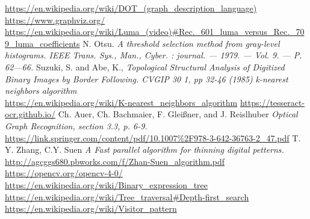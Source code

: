 \documentclass[makeidx, a4paper, 14pt]{extarticle}
\begin{document}
\begin{thebibliography}{}
     \url{https://en.wikipedia.org/wiki/DOT_(graph_description_language)}
        \url{https://www.graphviz.org/}
     \url{https://en.wikipedia.org/wiki/Luma_(video)#Rec._601_luma_versus_Rec._709_luma_coefficients}
     N. Otsu.
        \textit{A threshold selection method from gray-level histograms. IEEE Trans. Sys., Man., Cyber. : journal. — 1979. — Vol. 9. — P. 62—66.}
     Suzuki, S. and Abe, K.,
        \textit{Topological Structural Analysis of Digitized Binary Images by Border Following. CVGIP 30 1, pp 32-46 (1985)}
        \textit{k-nearest neighbors algorithm} \\
        \url{https://en.wikipedia.org/wiki/K-nearest_neighbors_algorithm}
        \url{https://tesseract-ocr.github.io/}
     Ch. Auer, Ch. Bachmaier, F. Gleißner, and J. Reislhuber
        \textit{Optical Graph Recognition, section 3.3, p. 6-9.}
        \url{https://link.springer.com/content/pdf/10.1007%2F978-3-642-36763-2_47.pdf}
      T. Y. Zhang, C.Y. Suen
        \textit{A Fast parallel algorithm for thinning digital petterns.}
        \url{http://agcggs680.pbworks.com/f/Zhan-Suen_algorithm.pdf}
        \url{https://opencv.org/opencv-4-0/}
        \url{https://en.wikipedia.org/wiki/Binary_expression_tree}
        \url{https://en.wikipedia.org/wiki/Tree_traversal#Depth-first_search}
        \url{https://en.wikipedia.org/wiki/Visitor_pattern}
\end{thebibliography}
\end{document}
